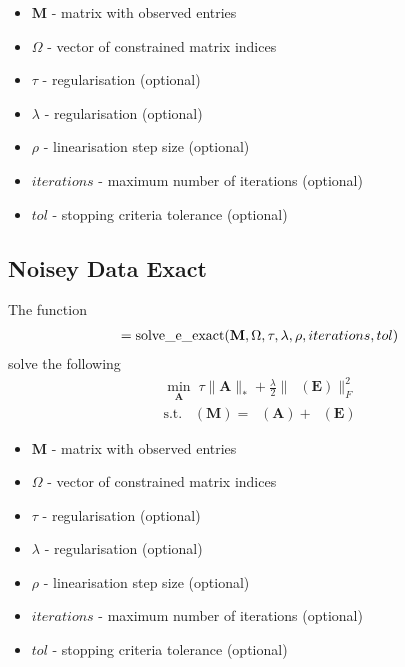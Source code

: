 \documentclass{article}
\DeclareMathOperator*{\pro}{\mathcal P_{\Omega}}
\begin{document}
\begin{itemize}
\item $\mathbf M$ - matrix with observed entries
\item $\Omega$ - vector of constrained matrix indices
\item $\tau$ - regularisation (optional)
\item $\lambda$ - regularisation (optional)
\item $\rho$ - linearisation step size (optional)
\item $iterations$ - maximum number of iterations (optional)
\item $tol$ - stopping criteria tolerance (optional)
\end{itemize}

\subsection{Noisey Data Exact}

The function
\begin{align}
[ \mathbf A, \mathbf{f\_vals}, \mathbf{stop\_vals} ] = \text{solve\_e\_exact}( \mathbf M, \Omega, \tau, \lambda, \rho, iterations, tol ) \notag
\end{align}
solve the following
\begin{align}
\min_{\mathbf A} \; \tau \| \mathbf A \|_* + \frac{\lambda}{2} \| \pro (\mathbf E) \|_F^2\\
\text{s.t.} \; \pro (\mathbf M) = \pro (\mathbf A) + \pro (\mathbf E) \nonumber 
\end{align}

\begin{itemize}
\item $\mathbf M$ - matrix with observed entries
\item $\Omega$ - vector of constrained matrix indices
\item $\tau$ - regularisation (optional)
\item $\lambda$ - regularisation (optional)
\item $\rho$ - linearisation step size (optional)
\item $iterations$ - maximum number of iterations (optional)
\item $tol$ - stopping criteria tolerance (optional)
\end{itemize}



\newpage


\end{document}
